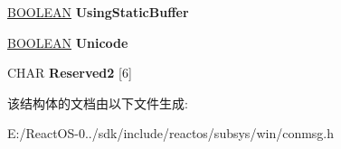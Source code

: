 \begin{DoxyCompactItemize}
\hyperlink{_processor_bind_8h_a112e3146cb38b6ee95e64d85842e380a}{B\+O\+O\+L\+E\+AN} {\bfseries Using\+Static\+Buffer}
\item 
\mbox{\label{struct___c_o_n_s_o_l_e___w_r_i_t_e_c_o_n_s_o_l_e_a94eb7b523e33724073e870e77ad753a6}} 
\hyperlink{_processor_bind_8h_a112e3146cb38b6ee95e64d85842e380a}{B\+O\+O\+L\+E\+AN} {\bfseries Unicode}
\item 
\mbox{\label{struct___c_o_n_s_o_l_e___w_r_i_t_e_c_o_n_s_o_l_e_a0f4c80a5cb878e70d5492ac8b0b809da}} 
C\+H\+AR {\bfseries Reserved2} \mbox{[}6\mbox{]}
\end{DoxyCompactItemize}


该结构体的文档由以下文件生成\+:\begin{DoxyCompactItemize}
\item 
E\+:/\+React\+O\+S-\/0../sdk/include/reactos/subsys/win/conmsg.\+h\end{DoxyCompactItemize}
